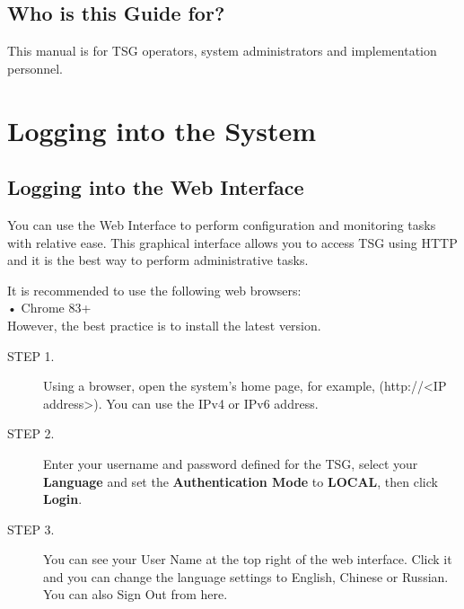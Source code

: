 \subsection*{\hypertarget{link:Who is this Guide for}{Who is this Guide for?}}
\label{sec:intro:overview:for}

This manual is for TSG operators, system administrators and implementation personnel.


\section*{\hypertarget{link:Logging into the System}{Logging into the System}}
\label{sec:intro:logging}

\subsection*{\hypertarget{link:Logging into the Web Interface}{Logging into the Web Interface}}
\label{sec:intro:logging:for}

You can use the Web Interface to perform configuration and monitoring tasks with relative ease. 
This graphical interface allows you to access TSG using HTTP and it is the best way to perform administrative tasks.


It is recommended to use the following web browsers:\\
• Chrome 83+\\
However, the best practice is to install the latest version.


\begin{description}
    \item[STEP 1.]Using a browser, open the system's home page, for example, (http://<IP address>). You can use the IPv4 or IPv6 address.
    \item[STEP 2.]Enter your username and password defined for the TSG, select your \textbf{Language} and set the \textbf{Authentication Mode} to \textbf{LOCAL}, then click \textbf{Login}.
    \item[STEP 3.]You can see your User Name at the top right of the web interface. Click it and you can change the language settings to English, Chinese or Russian. You can also Sign Out from here.
\end{description}


